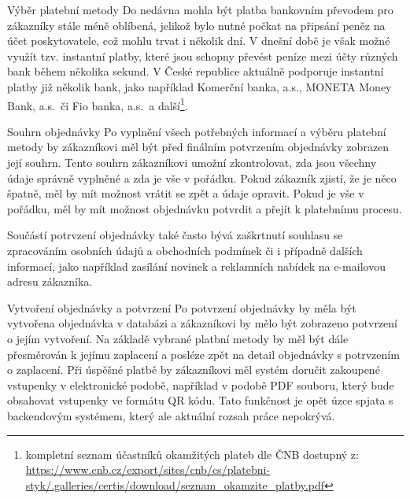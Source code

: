 \begin{subsection}{Výběr platební metody}
    Do nedávna mohla být platba bankovním převodem pro zákazníky stále méně oblíbená, jelikož bylo nutné počkat na připsání peněz na účet poskytovatele, což mohlu trvat i několik dní.
    V dnešní době je však možné využít tzv.
    instantní platby, které jsou schopny převést peníze mezi účty různých bank během několika sekund.
    V České republice aktuálně podporuje instantní platby již několik bank, jako například Komerční banka, a.s., MONETA Money Bank, a.s.\ či Fio banka, a.s.\ a další\footnote{kompletní seznam účastníků okamžitých plateb dle ČNB dostupný z: \url{https://www.cnb.cz/export/sites/cnb/cs/platebni-styk/.galleries/certis/download/seznam_okamzite_platby.pdf}}.
\end{subsection}

\begin{subsection}{Souhrn objednávky}
    \label{subsec:identifikace-dokonceni-objednavky-souhrn-objednavky}
    Po vyplnění všech potřebných informací a výběru platební metody by zákazníkovi měl být před finálním potvrzením objednávky zobrazen její souhrn.
    Tento souhrn zákazníkovi umožní zkontrolovat, zda jsou všechny údaje správně vyplněné a zda je vše v pořádku.
    Pokud zákazník zjistí, že je něco špatně, měl by mít možnost vrátit se zpět a údaje opravit.
    Pokud je vše v pořádku, měl by mít možnost objednávku potvrdit a přejít k platebnímu procesu.

    Součástí potrvzení objednávky také často bývá zaškrtnutí souhlasu se zpracováním osobních údajů a obchodních podmínek či i případně dalších informací, jako například zasílání novinek a reklamních nabídek na e-mailovou adresu zákazníka.
\end{subsection}

\begin{subsection}{Vytvoření objednávky a potvrzení}
    \label{subsec:identifikace-dokonceni-objednavky-vytvoreni-objednavky-a-potvrzeni}
    Po potvrzení objednávky by měla být vytvořena objednávka v databázi a zákazníkovi by mělo být zobrazeno potvrzení o jejím vytvoření.
    Na základě vybrané platbní metody by měl být dále přesměrován k jejímu zaplacení a posléze zpět na detail objednávky s potrvzením o zaplacení.
    Při úspěšné platbě by zákazníkovi měl systém doručit zakoupené vstupenky v elektronické podobě, například v podobě PDF souboru, který bude obsahovat vstupenky ve formátu QR kódu.
    Tato funkčnost je opět úzce spjata s backendovým systémem, který ale aktuální rozsah práce nepokrývá.
\end{subsection}
